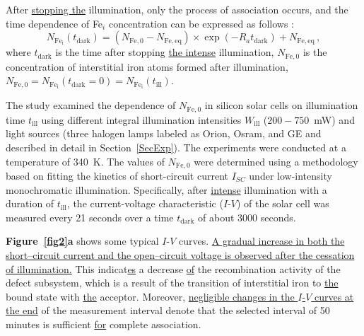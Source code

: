 \documentclass{WileyMSP-template}
\begin{document}
After \textcolor[rgb]{0.00,0.07,1.00}{\uline{stopping the}} illumination, only the process of association occurs,
and the time dependence of Fe$_i$ concentration can be expressed as follows \cite{FeB:kinetic,MurphyJAP2011}:
\begin{equation}
\label{eqNFet}
N_\mathrm{Fe_i}(t_\mathrm{dark})=(N_\mathrm{Fe,0}-N_\mathrm{Fe,eq})\times
\exp(-R_a t_\mathrm{dark})+N_\mathrm{Fe,eq}\,,
\end{equation}
where $t_\mathrm{dark}$ is the time after stopping \textcolor[rgb]{0.00,0.07,1.00}{\uline{the intense}} illumination,
$N_\mathrm{Fe,0}$ is the concentration of interstitial iron atoms formed after illumination,
$N_\mathrm{Fe,0}=N_\mathrm{Fe_i}(t_\mathrm{dark}=0)=N_\mathrm{Fe_i}(t_\mathrm{ill})$.

The study examined the dependence of $N_\mathrm{Fe,0}$ in silicon solar cells on illumination time $t_\mathrm{ill}$
using different integral illumination intensities $W_\mathrm{ill}$ ($200-750$~mW) and light sources
(three halogen lamps labeled as Orion, Osram, and GE and described in detail in Section~\ref{SecExp}).
The experiments were conducted at a temperature of 340~K.
The values of $N_\mathrm{Fe,0}$ were  determined using a methodology \cite{Olikh2022:JMatSci,Olikh2021JAP}
based on fitting the kinetics of short-circuit current $I_{SC}$ under low-intensity monochromatic illumination.
Specifically, after \textcolor[rgb]{0.00,0.07,1.00}{\uline{intense}} illumination with a duration of $t_\mathrm{ill}$,
the current-voltage characteristic ($I$-$V$) of the solar cell was measured every 21 seconds over a time $t_\mathrm{dark}$ of about 3000 seconds.

\textbf{Figure~\ref{fig2}a} shows some typical $I$-$V$ curves.
\textcolor[rgb]{0.00,0.07,1.00}{\uline{A gradual increase in both the short--circuit current and the open--circuit voltage is observed after the cessation of illumination.}}
This indicat\textcolor[rgb]{0.00,0.07,1.00}{\uline{es}} a decrease \textcolor[rgb]{0.00,0.07,1.00}{\uline{of}} the recombination activity of the defect subsystem,
which is a result of the transition of interstitial iron to \textcolor[rgb]{0.00,0.07,1.00}{\uline{the}} bound state with \textcolor[rgb]{0.00,0.07,1.00}{\uline{the}} acceptor.
Moreover, \textcolor[rgb]{0.00,0.07,1.00}{\uline{negligible changes in the $I$-$V$ curves at the end}} of the measurement interval denote that the selected interval of 50 minutes is sufficient \textcolor[rgb]{0.00,0.07,1.00}{\uline{for}} complete association.
\end{document}

